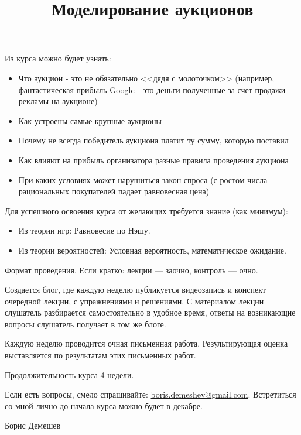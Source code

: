 \documentclass[pdftex,12pt,a4paper]{article}
\title{Моделирование аукционов}
\begin{document}
\maketitle




Из курса можно будет узнать:

\begin{itemize}

\item Что аукцион - это не обязательно <<дядя с молоточком>> (например, фантастическая прибыль Google - это деньги полученные за счет продажи рекламы на аукционе)

\item  Как устроены самые крупные аукционы

\item Почему не всегда победитель аукциона платит ту сумму, которую поставил

\item Как влияют на прибыль организатора разные правила проведения аукциона

\item При каких условиях может нарушиться закон спроса (с ростом числа рациональных покупателей падает равновесная цена)

\end{itemize}


Для успешного освоения курса от желающих требуется знание (как минимум):

\begin{itemize}
\item Из теории игр: Равновесие по Нэшу.
\item Из теории вероятностей: Условная вероятность, математическое ожидание.
\end{itemize}


Формат проведения. Если кратко: лекции — заочно, контроль — очно.

Создается блог, где каждую неделю публикуется видеозапись и конспект очередной лекции, с упражнениями и решениями. С материалом лекции слушатель разбирается самостоятельно в удобное время, ответы на возникающие вопросы слушатель получает в том же блоге.

Каждую неделю проводится очная письменная работа. Результирующая оценка выставляется по результатам этих письменных работ.

Продолжительность курса 4 недели.


Если есть вопросы, смело спрашивайте: \url{boris.demeshev@gmail.com}. Встретиться со мной лично до начала курса можно будет в декабре.


\vskip 30pt


Борис Демешев








%
\end{document}
